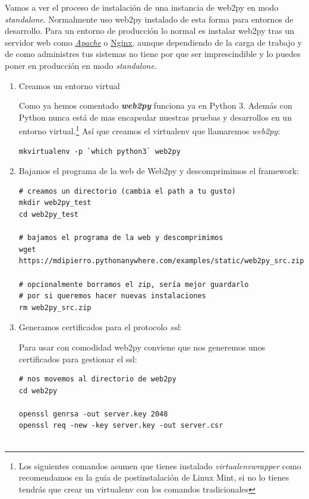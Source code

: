 \documentclass[
  12pt,
  spanish,
]{article}
\begin{document}
Vamos a ver el proceso de instalación de una instancia de web2py en modo
\emph{standalone}. Normalmente uso web2py instalado de esta forma para
entornos de desarrollo. Para un entorno de producción lo normal es
instalar web2py tras un servidor web como
\href{https://www.apache.org/}{\emph{Apache}} o
\href{https://www.nginx.com/}{Nginx}, aunque dependiendo de la carga de
trabajo y de como administres tus sistemas no tiene por que ser
imprescindible y lo puedes poner en producción en modo
\emph{standalone}.

\begin{enumerate}
\def\labelenumi{\arabic{enumi}.}
\item
  Creamos un entorno virtual

  Como ya hemos comentado \textbf{\emph{web2py}} funciona ya en Python
  3. Además con Python nunca está de mas encapsular nuestras pruebas y
  desarrollos en un entorno virtual.\footnote{Los siguientes comandos
    asumen que tienes instalado \emph{virtualenvwrapper} como
    recomendamos en la guía de postinstalación de Linux Mint, si no lo
    tienes tendrás que crear un virtualenv con los comandos
    tradicionales} Así que creamos el virtualenv que llamaremos
  \emph{web2py}:

\begin{verbatim}
mkvirtualenv -p `which python3` web2py
\end{verbatim}
\item
  Bajamos el programa de la web de Web2py y descomprimimos el framework:

\begin{verbatim}
# creamos un directorio (cambia el path a tu gusto)
mkdir web2py_test
cd web2py_test

# bajamos el programa de la web y descomprimimos
wget https://mdipierro.pythonanywhere.com/examples/static/web2py_src.zip

# opcionalmente borramos el zip, sería mejor guardarlo
# por si queremos hacer nuevas instalaciones
rm web2py_src.zip
\end{verbatim}
\item
  Generamos certificados para el protocolo \emph{ssl}:

  Para usar con comodidad web2py conviene que nos generemos unos
  certificados para gestionar el ssl:

\begin{verbatim}
# nos movemos al directorio de web2py
cd web2py

openssl genrsa -out server.key 2048
openssl req -new -key server.key -out server.csr


\end{verbatim}
\end{enumerate}
\end{document}

